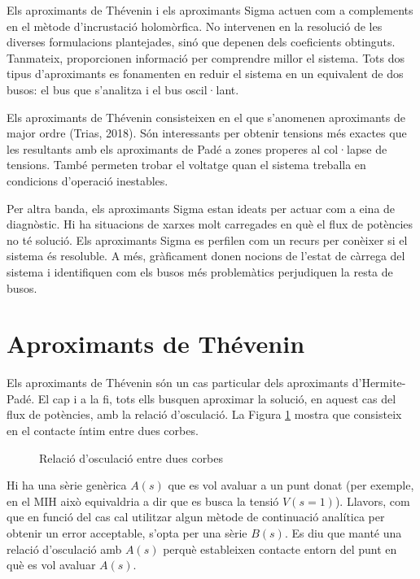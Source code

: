 Els aproximants de Thévenin i els aproximants Sigma actuen com a complements en el mètode d'incrustació holomòrfica. No intervenen en la resolució de les diverses formulacions plantejades, sinó que depenen dels coeficients obtinguts. Tanmateix, proporcionen informació per comprendre millor el sistema. Tots dos tipus d'aproximants es fonamenten en reduir el sistema en un equivalent de dos busos: el bus que s'analitza i el bus oscil·lant.

Els aproximants de Thévenin consisteixen en el que s'anomenen aproximants de major ordre (Trias, 2018). Són interessants per obtenir tensions més exactes que les resultants amb els aproximants de Padé a zones properes al col·lapse de tensions. També permeten trobar el voltatge quan el sistema treballa en condicions d'operació inestables.

Per altra banda, els aproximants Sigma estan ideats per actuar com a eina de diagnòstic. Hi ha situacions de xarxes molt carregades en què el flux de potències no té solució. Els aproximants Sigma es perfilen com un recurs per conèixer si el sistema és resoluble. A més, gràficament donen nocions de l'estat de càrrega del sistema i identifiquen com els busos més problemàtics perjudiquen la resta de busos. 

\section{Aproximants de Thévenin}
Els aproximants de Thévenin són un cas particular dels aproximants d'Hermite-Padé. El cap i a la fi, tots ells busquen aproximar la solució, en aquest cas del flux de potències, amb la relació d'osculació. La Figura \ref{fig:oscu1} mostra que consisteix en el contacte íntim entre dues corbes. 

\begin{figure}[!ht] \footnotesize
    \begin{center}
    \caption{Relació d'osculació entre dues corbes}
    \label{fig:oscu1}
    \end{center}
\end{figure}

Hi ha una sèrie genèrica $A(s)$ que es vol avaluar a un punt donat (per exemple, en el MIH això equivaldria a dir que es busca la tensió $V(s=1)$). Llavors, com que en funció del cas cal utilitzar algun mètode de continuació analítica per obtenir un error acceptable, s'opta per una sèrie $B(s)$. Es diu que manté una relació d'osculació amb $A(s)$ perquè estableixen contacte entorn del punt en què es vol avaluar $A(s)$. 

